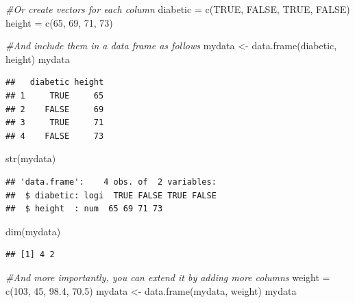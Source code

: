 \documentclass[
]{book}
\newenvironment{Shaded}{\begin{snugshade}}{\end{snugshade}}
\newcommand{\CommentTok}[1]{\textcolor[rgb]{0.56,0.35,0.01}{\textit{#1}}}
\newcommand{\ConstantTok}[1]{\textcolor[rgb]{0.00,0.00,0.00}{#1}}
\newcommand{\DecValTok}[1]{\textcolor[rgb]{0.00,0.00,0.81}{#1}}
\newcommand{\FloatTok}[1]{\textcolor[rgb]{0.00,0.00,0.81}{#1}}
\newcommand{\FunctionTok}[1]{\textcolor[rgb]{0.00,0.00,0.00}{#1}}
\newcommand{\NormalTok}[1]{#1}
\newcommand{\OtherTok}[1]{\textcolor[rgb]{0.56,0.35,0.01}{#1}}
\begin{document}
\begin{Shaded}
\begin{Highlighting}[]
\CommentTok{\#Or create vectors for each column}
\NormalTok{diabetic }\OtherTok{=} \FunctionTok{c}\NormalTok{(}\ConstantTok{TRUE}\NormalTok{, }\ConstantTok{FALSE}\NormalTok{, }\ConstantTok{TRUE}\NormalTok{, }\ConstantTok{FALSE}\NormalTok{)}
\NormalTok{height }\OtherTok{=} \FunctionTok{c}\NormalTok{(}\DecValTok{65}\NormalTok{, }\DecValTok{69}\NormalTok{, }\DecValTok{71}\NormalTok{, }\DecValTok{73}\NormalTok{)}

\CommentTok{\#And include them in a data frame as follows}
\NormalTok{mydata }\OtherTok{\textless{}{-}} \FunctionTok{data.frame}\NormalTok{(diabetic, height)}
\NormalTok{mydata}
\end{Highlighting}
\end{Shaded}

\begin{verbatim}
##   diabetic height
## 1     TRUE     65
## 2    FALSE     69
## 3     TRUE     71
## 4    FALSE     73
\end{verbatim}

\begin{Shaded}
\begin{Highlighting}[]
\FunctionTok{str}\NormalTok{(mydata)}
\end{Highlighting}
\end{Shaded}

\begin{verbatim}
## 'data.frame':    4 obs. of  2 variables:
##  $ diabetic: logi  TRUE FALSE TRUE FALSE
##  $ height  : num  65 69 71 73
\end{verbatim}

\begin{Shaded}
\begin{Highlighting}[]
\FunctionTok{dim}\NormalTok{(mydata)}
\end{Highlighting}
\end{Shaded}

\begin{verbatim}
## [1] 4 2
\end{verbatim}

\begin{Shaded}
\begin{Highlighting}[]
\CommentTok{\#And more importantly, you can extend it by adding more columns}
\NormalTok{weight }\OtherTok{=} \FunctionTok{c}\NormalTok{(}\DecValTok{103}\NormalTok{, }\DecValTok{45}\NormalTok{, }\FloatTok{98.4}\NormalTok{, }\FloatTok{70.5}\NormalTok{)}
\NormalTok{mydata }\OtherTok{\textless{}{-}} \FunctionTok{data.frame}\NormalTok{(mydata, weight)}
\NormalTok{mydata}
\end{Highlighting}
\end{Shaded}
\end{document}
